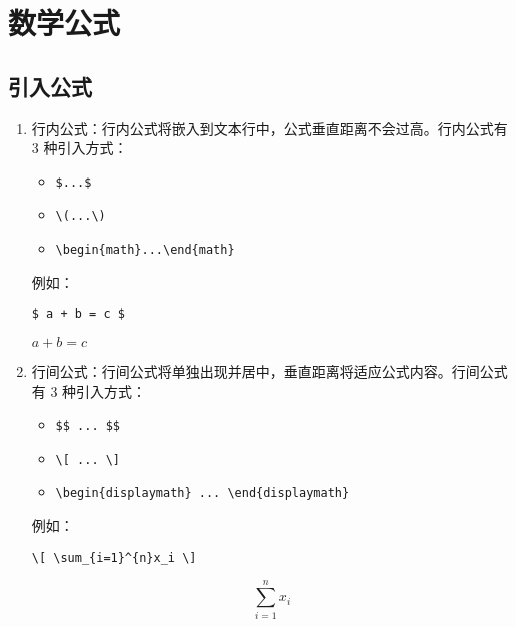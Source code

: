 \section{数学公式}

\subsection{引入公式}

\begin{enumerate}

\item 行内公式：行内公式将嵌入到文本行中，公式垂直距离不会过高。行内公式有 3 种引入方式：

\begin{itemize}
    \item \verb|$...$|
    \item \verb|\(...\)|
    \item \verb|\begin{math}...\end{math}|
\end{itemize}

例如：

\begin{tcolorbox}[sidebyside]
\begin{lstlisting}
$ a + b = c $
\end{lstlisting} 
\tcblower

$ a + b = c $
\end{tcolorbox}

\item 行间公式：行间公式将单独出现并居中，垂直距离将适应公式内容。行间公式有 3 种引入方式：

\begin{itemize}
    \item \verb|$$ ... $$|
    \item \verb|\[ ... \]|
    \item \verb|\begin{displaymath} ... \end{displaymath}|
\end{itemize}

例如：

\begin{tcolorbox}[sidebyside]
\begin{lstlisting}
\[ \sum_{i=1}^{n}x_i \]
\end{lstlisting} 

\tcblower

\[
    \sum_{i=1}^{n}x_i
\]
\end{tcolorbox}


\end{enumerate}

